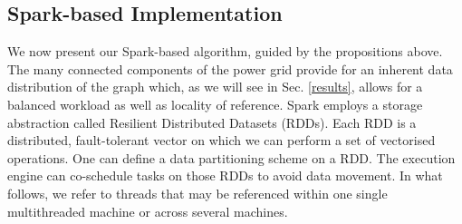 \subsection{Spark-based Implementation}
We now present our Spark-based algorithm, guided by the propositions above. The many connected components of the power grid provide for an inherent data distribution of the graph which, as we will see in Sec. \ref{results}, allows for a balanced workload as well as locality of reference. Spark employs a storage abstraction called Resilient Distributed Datasets (RDDs). Each RDD is a distributed, fault-tolerant vector on which we can perform a set of vectorised operations. One can define a data partitioning scheme on a RDD. The execution engine can co-schedule tasks on those RDDs to avoid data movement. In what follows, we refer to threads that may be referenced within one single multithreaded machine or across several machines.
%
%
